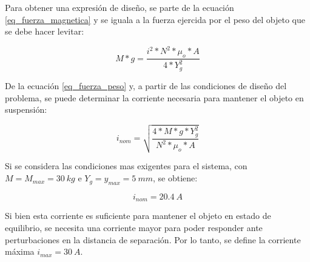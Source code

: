 \noindent Para obtener una expresión de diseño, se parte de la ecuación \ref{eq_fuerza_magnetica} y se iguala a la fuerza ejercida por el peso del objeto que se debe hacer levitar:

\begin{equation}\label{eq_fuerza_peso}
	M*g=\frac{i^{2}*N^{2}*\mu_{o}*A}{4*Y_{g}^{2}}
\end{equation}

\noindent De la ecuación \ref{eq_fuerza_peso} y, a partir de las condiciones de diseño del problema, se puede determinar la corriente necesaria para mantener el objeto en suspensión:

\begin{equation} \label{eq_corriente_peso}
	i_{nom}=\sqrt{\frac{4*M*g*Y_{g}^{2}}{N^{2}*\mu_{o}*A}}
\end{equation}

Si se considera las condiciones mas exigentes para el sistema, con $M=M_{max}=30\:kg$ e $Y_{g}=y_{max}=5\:mm$, se obtiene:

\begin{equation}
	i_{nom}=20.4\:A
\end{equation}

\noindent Si bien esta corriente es suficiente para mantener el objeto en estado de equilibrio, se necesita una corriente mayor para poder responder ante perturbaciones en la distancia de separación. Por lo tanto, se define la corriente máxima $i_{max}=30\:A$.







